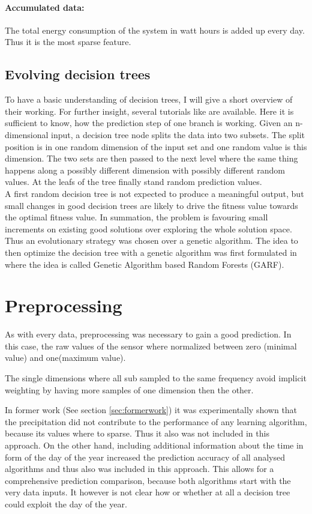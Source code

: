\documentclass[conference]{IEEEtran}
\begin{document}
\paragraph{Accumulated data:}
The total energy consumption of the system  in watt hours is added up every day. Thus it is the most sparse feature.


\subsection{Evolving decision trees}
\label{sec:GARF}

To have a basic understanding of decision trees, I will give a short overview of their working. For further insight, several tutorials like \cite{quinlan1986induction} are available. Here it is sufficient to know, how the prediction step of one branch is working. Given an n-dimensional input, a decision tree node splits the data into two subsets. The split position is in one random dimension of the input set and one random value is this dimension. The two sets are then passed to the next level where the same thing happens along a possibly different dimension with possibly different random values. At the leafs of the tree finally stand random prediction values.\\
A first random decision tree is not expected to produce a meaningful output, but small changes in good decision trees are likely to drive the fitness value towards the optimal fitness value. In summation, the problem is favouring small increments on existing good solutions over exploring the whole solution space. Thus an evolutionary strategy was chosen over a genetic algorithm.
The idea to then optimize the decision tree with a genetic algorithm was first formulated in \cite{bader2012garf} where the idea is called Genetic Algorithm based Random Forests (GARF).


\section{Preprocessing}

As with every data, preprocessing was necessary to gain a good prediction. In this case, the raw values of the sensor where normalized between zero (minimal value) and one(maximum value).

The single dimensions where all sub sampled to the same frequency avoid implicit weighting by having more samples of one dimension then the other.


In former work (See section \ref{sec:formerwork}) it was experimentally shown that the precipitation did not contribute to the performance of any learning algorithm, because its values where to sparse. Thus it also was not included in this approach.
On the other hand, including additional information about the time in form of the day of the year increased the prediction accuracy of all analysed algorithms and thus also was included in this approach. This allows for a comprehensive prediction comparison, because both algorithms start with the very data inputs. It however is not clear how or whether at all a decision tree could exploit the day of the year.
\end{document}
